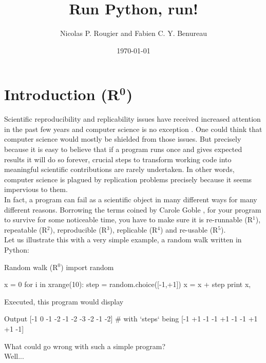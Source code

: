 \documentclass[a4paper,11pt]{article}
\title{Run Python, run!}
\author{Nicolas P. Rougier and Fabien C. Y. Benureau}
\date{\today}
\begin{document}
\maketitle


\section*{Introduction (R$^{\mathbf 0}$)}

Scientific reproducibility and replicability issues have received increased attention in the past few years and computer science is no exception \cite{Collberg:2016}.
One could think that computer science would mostly be shielded from those issues.
But precisely because it is easy to believe that if a program runs once and gives expected results it will do so forever, 
crucial steps to transform working code into meaningful scientific contributions are rarely undertaken. 
In other words, computer science is plagued by replication problems precisely because it seems impervious to them.\\

In fact, a program can fail as a scientific object in many different ways for many different reasons.
Borrowing the terms coined by Carole Goble \cite{Goble:2016}, for your program to survive for some noticeable time, you have to make sure it is re-runnable (R$^1$), repeatable (R$^2$), reproducible (R$^3$), replicable (R$^4$) and re-usable (R$^5$).\\

Let us illustrate this with a very simple example, a random walk written in Python:

\begin{code}{Random walk (R$^0$)}
import random

x = 0
for i in xrange(10):
    step = random.choice([-1,+1])
    x = x + step
    print x,
\end{code}

Executed, this program would display 
\begin{code}{Output}
[-1  0 -1 -2 -1 -2 -3 -2 -1 -2] # with `steps` being [-1 +1 -1 -1 +1 -1 -1 +1 +1 -1]
\end{code}

What could go wrong with such a simple program?\\
\vfill
Well...
\vfill
\end{document}
